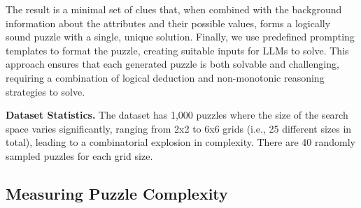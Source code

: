 The result is a minimal set of clues that, when combined with the background information about the attributes and their possible values, forms a logically sound puzzle with a single, unique solution. Finally, we use predefined prompting templates to format the puzzle, creating suitable inputs for LLMs to solve.
This approach ensures that each generated puzzle is both solvable and challenging, requiring a combination of logical deduction and non-monotonic reasoning strategies to solve.

\textbf{Dataset Statistics.}
The dataset has 1,000 puzzles where the size of the search space varies significantly, ranging from 2x2 to 6x6 grids (i.e., 25 different sizes in total), 
leading to a combinatorial explosion in complexity. There are 40 randomly sampled puzzles for each grid size. 



\subsection{Measuring Puzzle Complexity}

